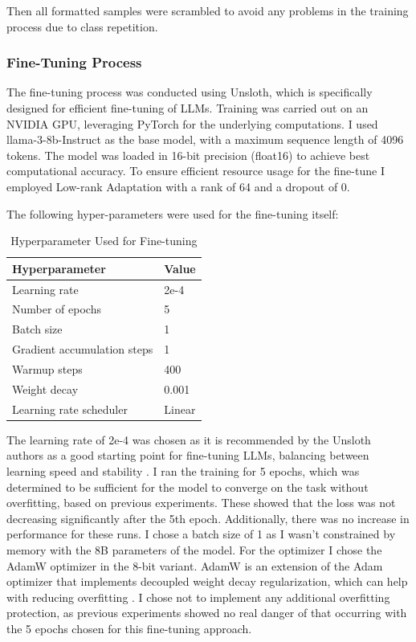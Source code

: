 Then all formatted samples were scrambled to avoid any problems in the training process due to class repetition.

\subsubsection{Fine-Tuning Process}
\label{sss:fine_tuning_process}
The fine-tuning process was conducted using Unsloth, which is specifically designed for efficient fine-tuning of LLMs. Training was carried out on an NVIDIA GPU, leveraging PyTorch for the underlying computations.
I used llama-3-8b-Instruct as the base model, with a maximum sequence length of 4096 tokens. The model was loaded in 16-bit precision (float16) to achieve best computational accuracy. To ensure efficient resource usage for the fine-tune I employed Low-rank Adaptation with a rank of 64 and a dropout of 0.

The following hyper-parameters were used for the fine-tuning itself:

\begin{table}[ht]
    \centering
    \begin{tabular}{ll}
        \toprule
        \textbf{Hyperparameter} & \textbf{Value} \\
        \midrule
        Learning rate & 2e-4 \\
        Number of epochs & 5 \\
        Batch size & 1 \\
        Gradient accumulation steps & 1 \\
        Warmup steps & 400 \\
        Weight decay & 0.001 \\
        Learning rate scheduler & Linear \\
        \bottomrule
    \end{tabular}
    \caption{Hyperparameter Used for Fine-tuning}
    \label{tab:fine_tuning_hyperparameters}
\end{table}
The learning rate of 2e-4 was chosen as it is recommended by the Unsloth authors as a good starting point for fine-tuning LLMs, balancing between learning speed and stability \citep{unsloth2024}. I ran the training for 5 epochs, which was determined to be sufficient for the model to converge on the task without overfitting, based on previous experiments. These showed that the loss was not decreasing significantly after the 5th epoch. Additionally, there was no increase in performance for these runs. I chose a batch size of 1 as I wasn't constrained by memory with the 8B parameters of the model. For the optimizer I chose the AdamW optimizer in the 8-bit variant. AdamW is an extension of the Adam optimizer that implements decoupled weight decay regularization, which can help with reducing overfitting \citep{Loshchilov2017}. I chose not to implement any additional overfitting protection, as previous experiments showed no real danger of that occurring with the 5 epochs chosen for this fine-tuning approach.

